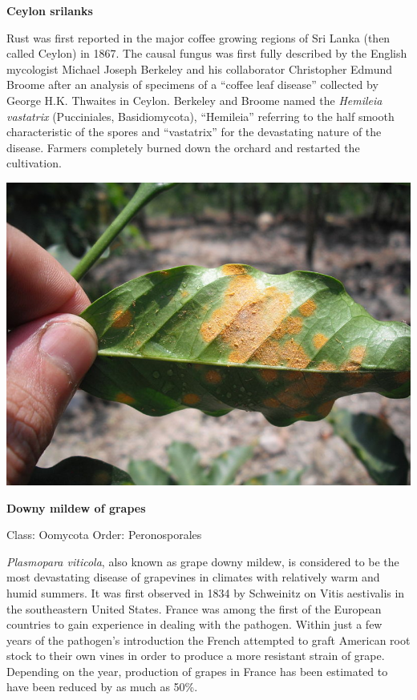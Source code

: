 \documentclass[
]{book}
\begin{document}
\textbf{Ceylon srilanks}

Rust was first reported in the major coffee growing regions of Sri Lanka (then called Ceylon) in 1867. The causal fungus was first fully described by the English mycologist Michael Joseph Berkeley and his collaborator Christopher Edmund Broome after an analysis of specimens of a ``coffee leaf disease'' collected by George H.K. Thwaites in Ceylon. Berkeley and Broome named the \emph{Hemileia vastatrix} (Pucciniales, Basidiomycota), ``Hemileia'' referring to the half smooth characteristic of the spores and ``vastatrix'' for the devastating nature of the disease. Farmers completely burned down the orchard and restarted the cultivation.

\begin{center}\includegraphics[width=0.8\linewidth]{./images/hemileia_vastatrix_coffee_leaf_rust} \end{center}

\textbf{Downy mildew of grapes}

Class: Oomycota
Order: Peronosporales

\emph{Plasmopara viticola}, also known as grape downy mildew, is considered to be the most devastating disease of grapevines in climates with relatively warm and humid summers. It was first observed in 1834 by Schweinitz on Vitis aestivalis in the southeastern United States. France was among the first of the European countries to gain experience in dealing with the pathogen. Within just a few years of the pathogen's introduction the French attempted to graft American root stock to their own vines in order to produce a more resistant strain of grape. Depending on the year, production of grapes in France has been estimated to have been reduced by as much as 50\%.
\end{document}
